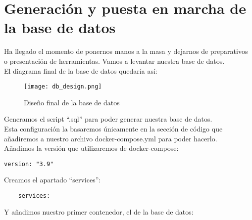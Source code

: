 \section{Generación y puesta en marcha de la base de datos}

Ha llegado el momento de ponernos manos a la masa y dejarnos de preparativos o presentación de herramientas. Vamos a levantar nuestra base de datos.
\\El diagrama final de la base de datos quedaría así:
\begin{figure}
    \texttt{[image: db\_design.png]}
    \caption{Diseño final de la base de datos}
\end{figure}
Generamos el script ``.sql'' para poder generar nuestra base de datos.
\\Esta configuración la basaremos únicamente en la sección de código que añadiremos a nuestro archivo docker-compose.yml para poder hacerlo.
\\Añadimos la versión que utilizaremos de docker-compose:

\begin{verbatim}
version: "3.9"
\end{verbatim}

Creamos el apartado ``services'':

\begin{verbatim}
    services:
\end{verbatim}

Y añadimos nuestro primer contenedor, el de la base de datos:

